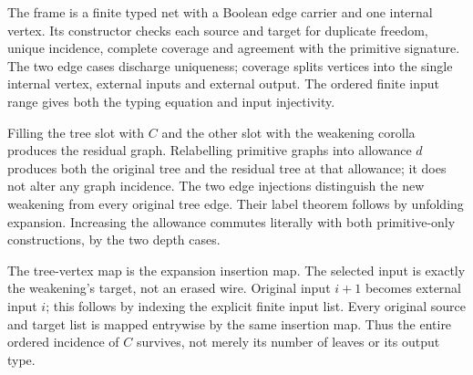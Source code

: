 The frame is a finite typed net with a Boolean edge carrier and one internal
vertex. Its constructor checks each source and target for duplicate freedom,
unique incidence, complete coverage and agreement with the primitive signature.
The two edge cases discharge uniqueness; coverage splits vertices into the
single internal vertex, external inputs and external output. The ordered
finite input range gives both the typing equation and input injectivity.


Filling the tree slot with $C$ and the other slot with the weakening corolla
produces the residual graph. Relabelling primitive graphs into allowance $d$
produces both the original tree and the residual tree at that allowance;
it does not alter any graph incidence. The two edge injections distinguish
the new weakening from every original tree edge. Their label theorem follows
by unfolding expansion. Increasing the allowance commutes literally with
both primitive-only constructions, by the two depth cases.









The tree-vertex map is the expansion insertion map. The selected input is
exactly the weakening's target, not an erased wire. Original input $i+1$
becomes external input $i$; this follows by indexing the explicit finite
input list. Every original source and target list is mapped entrywise by
the same insertion map. Thus the entire ordered incidence of $C$ survives,
not merely its number of leaves or its output type.



